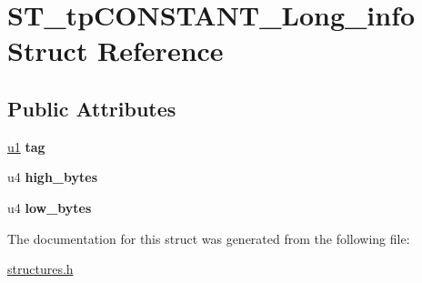 \hypertarget{structST__tpCONSTANT__Long__info}{}\section{S\+T\+\_\+tp\+C\+O\+N\+S\+T\+A\+N\+T\+\_\+\+Long\+\_\+info Struct Reference}
\label{structST__tpCONSTANT__Long__info}
\subsection*{Public Attributes}
\begin{DoxyCompactItemize}
\item 
\mbox{\label{structST__tpCONSTANT__Long__info_a752fcdf3f5870c5f58063f7065b6bb35}} 
\mbox{\hyperlink{structures_8h_ad9f4cdb6757615aae2fad89dab3c5470}{u1}} {\bfseries tag}
\item 
\mbox{\label{structST__tpCONSTANT__Long__info_af9aa6513cf50963b36a16a29fe46bade}} 
u4 {\bfseries high\+\_\+bytes}
\item 
\mbox{\label{structST__tpCONSTANT__Long__info_ab70fc512115cc32231c7fe01de14931b}} 
u4 {\bfseries low\+\_\+bytes}
\end{DoxyCompactItemize}


The documentation for this struct was generated from the following file\+:\begin{DoxyCompactItemize}
\item 
\mbox{\hyperlink{structures_8h}{structures.\+h}}\end{DoxyCompactItemize}
